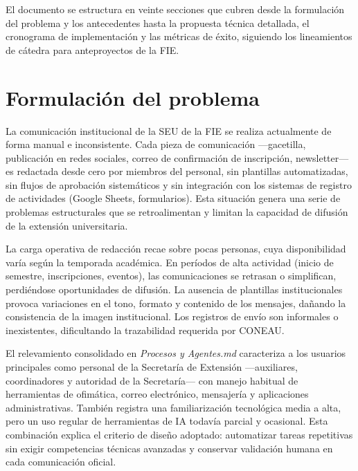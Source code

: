 \documentclass[a4paper, 12pt]{article}
\begin{document}
El documento se estructura en veinte secciones que cubren desde la formulaci\'on del problema y los antecedentes hasta la propuesta t\'ecnica detallada, el cronograma de implementaci\'on y las m\'etricas de \'exito, siguiendo los lineamientos de c\'atedra para anteproyectos de la \ac{FIE}.

\section{Formulaci\'on del problema}

La comunicaci\'on institucional de la \ac{SEU} de la \ac{FIE} se realiza actualmente de forma manual e inconsistente. Cada pieza de comunicaci\'on ---gacetilla, publicaci\'on en redes sociales, correo de confirmaci\'on de inscripci\'on, newsletter--- es redactada desde cero por miembros del personal, sin plantillas automatizadas, sin flujos de aprobaci\'on sistem\'aticos y sin integraci\'on con los sistemas de registro de actividades (Google Sheets, formularios). Esta situaci\'on genera una serie de problemas estructurales que se retroalimentan y limitan la capacidad de difusi\'on de la extensi\'on universitaria.

La carga operativa de redacci\'on recae sobre pocas personas, cuya disponibilidad var\'ia seg\'un la temporada acad\'emica. En per\'iodos de alta actividad (inicio de semestre, inscripciones, eventos), las comunicaciones se retrasan o simplifican, perdi\'endose oportunidades de difusi\'on. La ausencia de plantillas institucionales provoca variaciones en el tono, formato y contenido de los mensajes, da\~nando la consistencia de la imagen institucional. Los registros de env\'io son informales o inexistentes, dificultando la trazabilidad requerida por \ac{CONEAU}.

El relevamiento consolidado en \textit{Procesos y Agentes.md} caracteriza a los usuarios principales como personal de la Secretar\'ia de Extensi\'on ---auxiliares, coordinadores y autoridad de la Secretar\'ia--- con manejo habitual de herramientas de ofim\'atica, correo electr\'onico, mensajer\'ia y aplicaciones administrativas. Tambi\'en registra una familiarizaci\'on tecnol\'ogica media a alta, pero un uso regular de herramientas de IA todav\'ia parcial y ocasional. Esta combinaci\'on explica el criterio de dise\~no adoptado: automatizar tareas repetitivas sin exigir competencias t\'ecnicas avanzadas y conservar validaci\'on humana en cada comunicaci\'on oficial.
\end{document}
